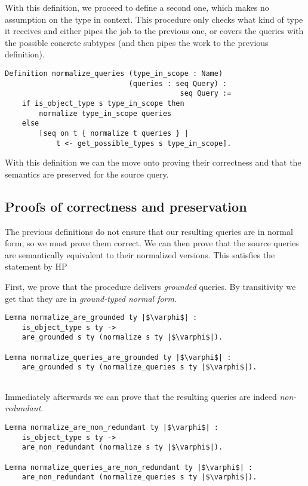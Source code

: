 With this definition, we proceed to define a second one, which makes no assumption on the type in context. This procedure only checks what kind of type it receives and either pipes the job to the previous one, or covers the queries with the possible concrete subtypes (and then pipes the work to the previous definition).

\begin{verbatim}
Definition normalize_queries (type_in_scope : Name) 
                             (queries : seq Query) :
                                         seq Query :=
    if is_object_type s type_in_scope then
        normalize type_in_scope queries
    else
        [seq on t { normalize t queries } |
            t <- get_possible_types s type_in_scope].

\end{verbatim}

With this definition we can the move onto proving their correctness and that the semantics are preserved for the source query.

\subsection{Proofs of correctness and preservation}

The previous definitions do not ensure that our resulting queries are in normal form, so we must prove them correct. We can then prove that the source queries are semantically equivalent to their normalized versions. This satisfies the statement by HP

First, we prove that the procedure delivers \textit{grounded} queries. By transitivity we get that they are in \textit{ground-typed normal form}.

\begin{verbatim}
Lemma normalize_are_grounded ty |$\varphi$| :
    is_object_type s ty ->
    are_grounded s ty (normalize s ty |$\varphi$|).
    
Lemma normalize_queries_are_grounded ty |$\varphi$| :
    are_grounded s ty (normalize_queries s ty |$\varphi$|).
 
\end{verbatim}

Immediately afterwards we can prove that the resulting queries are indeed \textit{non-redundant}. 

\begin{verbatim}
Lemma normalize_are_non_redundant ty |$\varphi$| :
    is_object_type s ty ->
    are_non_redundant (normalize s ty |$\varphi$|).
    
Lemma normalize_queries_are_non_redundant ty |$\varphi$| :
    are_non_redundant (normalize_queries s ty |$\varphi$|).
\end{verbatim}

